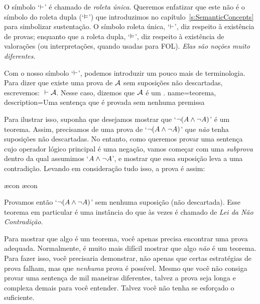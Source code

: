 O s\'imbolo `$\vdash$'  \'e chamado de  \emph{roleta \'unica}. Queremos enfatizar que este n\~ao \'e o s\'imbolo do roleta dupla (`$\vDash$') que introduzimos no cap\'itulo~\ref{s:SemanticConcepts}  para simbolizar sustenta\c c\~ao. O s\'imbolo roleta \'unica, `$\vdash$', diz respeito \`a exist\^encia de provas; enquanto que a roleta dupla, `$\vDash$', diz respeito \`a exist\^encia de valora\c c\~oes (ou interpreta\c c\~oes, quando usadas para FOL). \emph{Elas s\~ao no\c c\~oes muito diferentes}.

Com o nosso s\'imbolo  `$\vdash$',  podemos introduzir um pouco mais de terminologia. Para dizer que existe uma prova de $\mathcal{A}$ sem suposi\c c\~oes n\~ao descartadas, escrevemos: ${} \vdash \mathcal{A}$. Nesse caso, dizemos que $\mathcal{A}$ \'e um .
{
name=teorema,
description={Uma senten\c ca que \'e provada sem nenhuma premissa}
}

Para ilustrar isso, suponha que desejamos mostrar que `$\neg (A \wedge \neg A)$' \'e um teorema. Assim, precisamos de uma prova de `$\neg(A \wedge \neg A)$' que \emph{n\~ao} tenha suposi\c c\~oes n\~ao descartadas. No entanto, como queremos provar uma senten\c ca cujo operador l\'ogico principal \'e uma nega\c c\~ao, vamos come\c car com uma \emph{subprova}  dentro da qual assumimos `$A \wedge \neg A$', e mostrar que essa suposi\c c\~ao leva a uma contradi\c c\~ao. Levando em considera\c c\~ao tudo isso, a prova \'e assim:
	\begin{fitchproof}
		\open
			\ae{con}
			\ae{con}
		\close
	\end{fitchproof}
Provamos ent\~ao `$\neg (A \wedge \neg A)$' sem nenhuma suposi\c c\~ao (n\~ao descartada).  Esse teorema em particular \'e uma inst\^ancia do que \`as vezes \'e chamado de \emph{Lei da N\~ao Contradi\c c\~ao}.

Para mostrar que algo \'e um teorema, voc\^e apenas precisa encontrar uma prova adequada. Normalmente, \'e muito mais dif\'icil mostrar que algo \emph{n\~ao} \'e um teorema. Para fazer isso, voc\^e precisaria demonstrar, n\~ao apenas que certas estrat\'egias de prova falham, mas que \emph{nenhuma} prova \'e poss\'ivel. Mesmo que voc\^e n\~ao consiga provar uma senten\c ca de mil maneiras diferentes, talvez a prova seja longa e complexa demais para voc\^e entender. Talvez voc\^e n\~ao tenha se esfor\c cado o suficiente.

